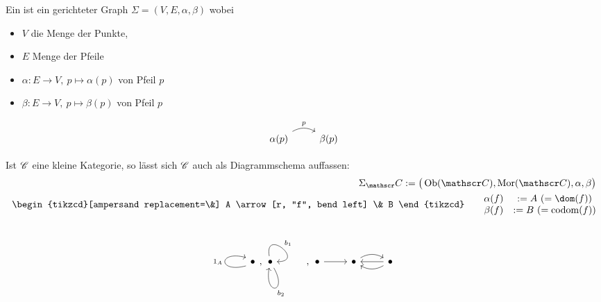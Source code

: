 \begin{definition}\enter
	Ein  ist ein gerichteter Graph $\Sigma=(V,E,\alpha,\beta)$ wobei 
	\begin{itemize}
		\item $V$ die Menge der Punkte,
		\item $E$ Menge der Pfeile
		\item $\alpha:E\to V,~p\mapsto\alpha(p)$  von Pfeil $p$
		\item $\beta:E\to V,~p\mapsto\beta(p)$  von Pfeil $p$
	\end{itemize}
	$$
	\begin{tikzcd}
\alpha(p) \arrow[r, "p", bend left] & \beta(p)
\end{tikzcd}
$$
\end{definition}\enter
Ist $\mathscr C$ eine kleine Kategorie, so lässt sich $\mathscr C$ auch als Diagrammschema auffassen:
\begin{align*}
	\Sigma_\Cat:=\big(\Ob(\Cat),\Mor(\Cat),\alpha,\beta\big)\\
		\begin{tikzcd}[ampersand replacement=\&]
A \arrow[r, "f", bend left] \& B
\end{tikzcd}\qquad\begin{matrix}
	\alpha(f)& :=A~(=\dom(f))\\
	\beta(f)&:=B~(=\codom(f))
\end{matrix}
\end{align*}

\begin{bsp} %
	$$\begin{tikzcd} 
	\arrow[loop left, distance=3em, start anchor={[yshift=-1ex]west}, end anchor={[yshift=1ex]west}]{}{1_A} \bullet 
	\end{tikzcd},
	\begin{tikzcd}
	\bullet \arrow[out=100, in=0, loop, distance=3em, "b_1"] \arrow[out=300, in=260, loop, distance=3em, "b_2"]
	\end{tikzcd},
	\begin{tikzcd}
	\bullet \arrow[r] & \bullet \arrow[r, bend left] & \bullet \arrow[l] \arrow[l, bend left]
	\end{tikzcd}$$
\end{bsp}

